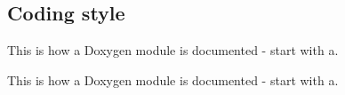 \hypertarget{a00045}{\subsection{\-Coding style}
\label{a00045}
}


\-This is how a \-Doxygen module is documented -\/ start with a.  


\-This is how a \-Doxygen module is documented -\/ start with a. 
